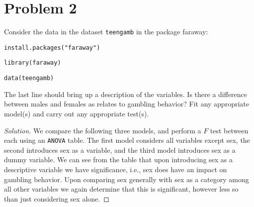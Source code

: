 \documentclass{amsart}\usepackage[]{graphicx}\usepackage[]{color}
\begin{document}
	\section*{Problem 2} %
	\label{sec:problem_2}
		Consider the data in the dataset \verb|teengamb| in the package faraway:

			\verb|install.packages("faraway")|

			\verb|library(faraway)|

			\verb|data(teengamb)|

		The last line should bring up a description of the variables.
		Is there a difference between males and females as relates to gambling behavior?
		Fit any appropriate model(s) and carry out any appropriate test(s).
		\begin{proof}[Solution] We compare the following three models, and perform a $F$ test between each using an \verb|ANOVA| table.
		The first model considers all variables except sex, the second introduces sex as a variable, and the third model introduces sex as a dummy variable.
		We can see from the table that upon introducing sex as a descriptive variable we have significance, i.e., sex does have an impact on gambling behavior.
		Upon comparing sex generally with sex as a category among all other variables we again determine that this is significant, however less so than just considering sex alone.


\end{proof}
\end{document}
